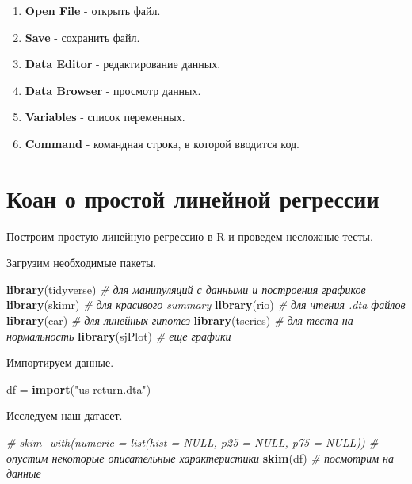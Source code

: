 \documentclass[]{book}
\newenvironment{Shaded}{\begin{snugshade}}{\end{snugshade}}
\newcommand{\CommentTok}[1]{\textcolor[rgb]{0.56,0.35,0.01}{\textit{#1}}}
\newcommand{\KeywordTok}[1]{\textcolor[rgb]{0.13,0.29,0.53}{\textbf{#1}}}
\newcommand{\NormalTok}[1]{#1}
\newcommand{\StringTok}[1]{\textcolor[rgb]{0.31,0.60,0.02}{#1}}
\providecommand{\tightlist}{%
  \setlength{\itemsep}{0pt}\setlength{\parskip}{0pt}}
\begin{document}
\begin{enumerate}
\def\labelenumi{\arabic{enumi}.}
\tightlist
\item
  \textbf{Open File} - открыть файл.
\item
  \textbf{Save} - сохранить файл.
\item
  \textbf{Data Editor} - редактирование данных.
\item
  \textbf{Data Browser} - просмотр данных.
\item
  \textbf{Variables} - список переменных.
\item
  \textbf{Command} - командная строка, в которой вводится код.
\end{enumerate}

\hypertarget{simplereg}{%
\chapter{Коан о простой линейной регрессии}\label{simplereg}}

Построим простую линейную регрессию в R и проведем несложные тесты.

Загрузим необходимые пакеты.

\begin{Shaded}
\begin{Highlighting}[]
\KeywordTok{library}\NormalTok{(tidyverse) }\CommentTok{# для манипуляций с данными и построения графиков}
\KeywordTok{library}\NormalTok{(skimr) }\CommentTok{# для красивого summary}
\KeywordTok{library}\NormalTok{(rio) }\CommentTok{# для чтения .dta файлов}
\KeywordTok{library}\NormalTok{(car) }\CommentTok{# для линейных гипотез}
\KeywordTok{library}\NormalTok{(tseries) }\CommentTok{# для теста на нормальность}
\KeywordTok{library}\NormalTok{(sjPlot) }\CommentTok{# еще графики}
\end{Highlighting}
\end{Shaded}

Импортируем данные.

\begin{Shaded}
\begin{Highlighting}[]
\NormalTok{df =}\StringTok{ }\KeywordTok{import}\NormalTok{(}\StringTok{"us-return.dta"}\NormalTok{)}
\end{Highlighting}
\end{Shaded}

Исследуем наш датасет.

\begin{Shaded}
\begin{Highlighting}[]
\CommentTok{# skim_with(numeric = list(hist = NULL, p25 = NULL, p75 = NULL)) # опустим некоторые описательные характеристики}
\KeywordTok{skim}\NormalTok{(df) }\CommentTok{# посмотрим на данные}
\end{Highlighting}
\end{Shaded}
\end{document}
